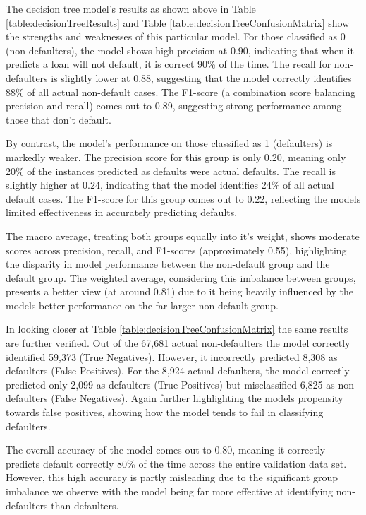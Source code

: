 \documentclass[12pt]{article}
\begin{document}
The decision tree model's results as shown above in Table \ref{table:decisionTreeResults} and Table \ref{table:decisionTreeConfusionMatrix} show the strengths and weaknesses of this particular model. For those classified as 0 (non-defaulters), the model shows high precision at 0.90, indicating that when it predicts a loan will not default, it is correct 90\% of the time. The recall for non-defaulters is slightly lower at 0.88, suggesting that the model correctly identifies 88\% of all actual non-default cases. The F1-score (a combination score balancing precision and recall) comes out to 0.89, suggesting strong performance among those that don't default.

By contrast, the model's performance on those classified as 1 (defaulters) is markedly weaker. The precision score for this group is only 0.20, meaning only 20\% of the instances predicted as defaults were actual defaults. The recall is slightly higher at 0.24, indicating that the model identifies 24\% of all actual default cases. The F1-score for this group comes out to 0.22, reflecting the models limited effectiveness in accurately predicting defaults.

The macro average, treating both groups equally into it's weight, shows moderate scores across precision, recall, and F1-scores (approximately 0.55), highlighting the disparity in model performance between the non-default group and the default group. The weighted average, considering this imbalance between groups, presents a better view (at around 0.81) due to it being heavily influenced by the models better performance on the far larger non-default group.

In looking closer at Table \ref{table:decisionTreeConfusionMatrix} the same results are further verified. Out of the 67,681 actual non-defaulters the model correctly identified 59,373 (True Negatives). However, it incorrectly predicted 8,308 as defaulters (False Positives). For the 8,924 actual defaulters, the model correctly predicted only 2,099 as defaulters (True Positives) but misclassified 6,825 as non-defaulters (False Negatives). Again further highlighting the models propensity towards false positives, showing how the model tends to fail in classifying defaulters.

The overall accuracy of the model comes out to 0.80, meaning it correctly predicts default correctly 80\% of the time across the entire validation data set. However, this high accuracy is partly misleading due to the significant group imbalance we observe with the model being far more effective at identifying non-defaulters than defaulters.
\end{document}
